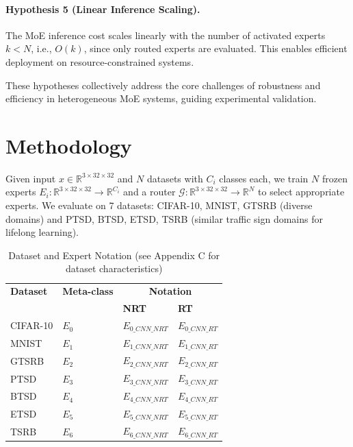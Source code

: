 \documentclass[11pt,a4paper]{article}
\begin{document}
\paragraph{Hypothesis 5 (Linear Inference Scaling).}
The MoE inference cost scales linearly with the number of activated experts $k < N$, i.e., $O(k)$, since only routed experts are evaluated. This enables efficient deployment on resource-constrained systems.

These hypotheses collectively address the core challenges of robustness and efficiency in heterogeneous MoE systems, guiding experimental validation.

\section{Methodology}

Given input $x \in \mathbb{R}^{3 \times 32 \times 32}$ and $N$ datasets with $C_i$ classes each, we train $N$ frozen experts $E_i: \mathbb{R}^{3 \times 32 \times 32} \to \mathbb{R}^{C_i}$ and a router $\mathcal{G}: \mathbb{R}^{3 \times 32 \times 32} \to \mathbb{R}^N$ to select appropriate experts. We evaluate on 7 datasets: CIFAR-10, MNIST, GTSRB (diverse domains) and PTSD, BTSD, ETSD, TSRB (similar traffic sign domains for lifelong learning).

\begin{table}[H]
\centering
\begin{tabular}{llll}
\toprule
\textbf{Dataset} & \textbf{Meta-class} & \multicolumn{2}{c}{\textbf{Notation}} \\
 & & \textbf{NRT} & \textbf{RT} \\
\midrule
CIFAR-10 & $E_0$ & $E_{0\_CNN\_NRT}$ & $E_{0\_CNN\_RT}$ \\
MNIST & $E_1$ & $E_{1\_CNN\_NRT}$ & $E_{1\_CNN\_RT}$ \\
GTSRB & $E_2$ & $E_{2\_CNN\_NRT}$ & $E_{2\_CNN\_RT}$ \\
PTSD & $E_3$ & $E_{3\_CNN\_NRT}$ & $E_{3\_CNN\_RT}$ \\
BTSD & $E_4$ & $E_{4\_CNN\_NRT}$ & $E_{4\_CNN\_RT}$ \\
ETSD & $E_5$ & $E_{5\_CNN\_NRT}$ & $E_{5\_CNN\_RT}$ \\
TSRB & $E_6$ & $E_{6\_CNN\_NRT}$ & $E_{6\_CNN\_RT}$ \\
\bottomrule
\end{tabular}
\caption{Dataset and Expert Notation (see Appendix C for dataset characteristics)}
\end{table}
\end{document}
